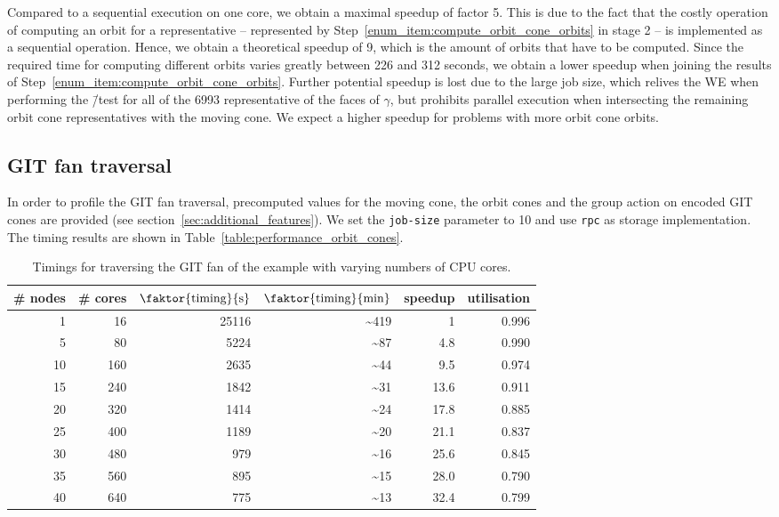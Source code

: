 Compared to a sequential execution on one core, we obtain a maximal speedup of factor 5. This is due to the fact that the costly operation of computing an orbit for a representative -- represented by Step~\ref{enum_item:compute_orbit_cone_orbits} in stage 2 -- is implemented as a sequential operation. Hence, we obtain a theoretical speedup of 9, which is the amount of orbits that have to be computed. Since the required time for computing different orbits varies greatly between 226 and 312 seconds, we obtain a lower speedup when joining the results of Step~\ref{enum_item:compute_orbit_cone_orbits}. Further potential speedup is lost due to the large job size, which relives the \ac{WE} when performing the \aface{}\=/test for all of the 6993 representative of the faces of $\gamma$, but prohibits parallel execution when intersecting the remaining orbit cone representatives with the moving cone. We expect a higher speedup for problems with more orbit cone orbits.

\subsection*{GIT fan traversal}

In order to profile the GIT fan traversal, precomputed values for the moving cone, the orbit cones and the group action on encoded GIT cones are provided (see section~\ref{sec:additional_features}). We set the \texttt{job-size} parameter to 10 and use \texttt{rpc} as storage implementation. The timing results are shown in Table~\ref{table:performance_orbit_cones}.

\begin{table}
	\centering
	\begin{tabular}{@{}rrrrrr@{}}
		\toprule
		\# nodes & \# cores & $\faktor{\text{timing}}{\text{s}}$ & $\faktor{\text{timing}}{\text{min}}$ & speedup & utilisation \\
		\midrule
		1  & 16  & 25116 & \textasciitilde 419 & 1    & 0.996 \\
		5  & 80  & 5224  & \textasciitilde 87  & 4.8  & 0.990 \\
		10 & 160 & 2635  & \textasciitilde 44  & 9.5  & 0.974 \\
		15 & 240 & 1842  & \textasciitilde 31  & 13.6 & 0.911 \\
		20 & 320 & 1414  & \textasciitilde 24  & 17.8 & 0.885 \\
		25 & 400 & 1189  & \textasciitilde 20  & 21.1 & 0.837 \\
		30 & 480 & 979   & \textasciitilde 16  & 25.6 & 0.845 \\
		35 & 560 & 895   & \textasciitilde 15  & 28.0 & 0.790 \\
		40 & 640 & 775   & \textasciitilde 13  & 32.4 & 0.799 \\
		\bottomrule
	\end{tabular}
	\caption{Timings for traversing the GIT fan of the \msix{} example with varying numbers of CPU cores.}
	\label{table:performance_gitfan_traversal}
\end{table}

